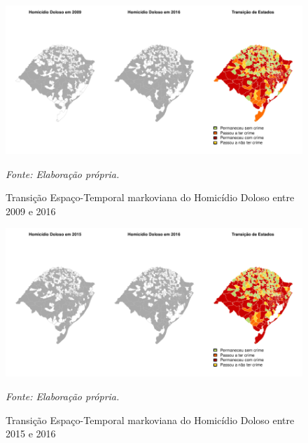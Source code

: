 \documentclass[12pt,openright,oneside,a4paper,english,french,spanish]{abntex2}
\numberwithin{table}{section} %
\numberwithin{figure}{section} %
\newcommand{\source}[1]{\textit{#1}}
\begin{document}
\begin{subappendices}
\begin{figure}[H]
\begin{center}
\includegraphics{TESE_DE_DOUTORADO_RENAN_FINAL-map_hom_dol_2009_2016}
\end{center}
\caption{Transição Espaço-Temporal markoviana do Homicídio Doloso entre 2009 e 2016}
\source{Fonte: Elaboração própria.}
\label{fig:mapas_hom_dol_markov_2009_2016}
\end{figure}

\begin{figure}[H]
\begin{center}
\includegraphics{TESE_DE_DOUTORADO_RENAN_FINAL-map_hom_dol_2015_2016}
\end{center}
\caption{Transição Espaço-Temporal markoviana do Homicídio Doloso entre 2015 e 2016}
\source{Fonte: Elaboração própria.}
\label{fig:mapas_hom_dol_markov_2015_2016}
\end{figure}



\end{subappendices}
\end{document}
